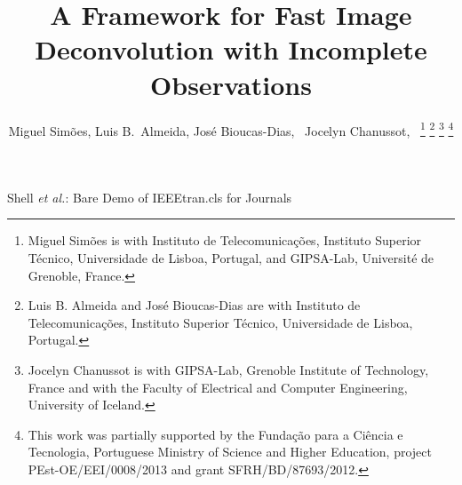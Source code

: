 \documentclass[10pt,twocolumn,twoside]{IEEEtran}
\begin{document}
\title{A Framework for Fast Image Deconvolution with Incomplete Observations}

\author{Miguel Sim\~{o}es, Luis B.\ Almeida, Jos\'{e} Bioucas-Dias,~ Jocelyn Chanussot,~%
\thanks{Miguel Sim\~{o}es is with Instituto de Telecomunica\c{c}\~{o}es, Instituto
Superior T\'{e}cnico, Universidade de Lisboa, Portugal, and GIPSA-Lab, Universit\'{e} de Grenoble, France.}%
\thanks{Luis B. Almeida and Jos\'{e} Bioucas-Dias are with Instituto de Telecomunica\c{c}\~{o}es, Instituto
Superior T\'{e}cnico, Universidade de Lisboa, Portugal.}%
\thanks{Jocelyn Chanussot is with GIPSA-Lab, Grenoble Institute of Technology, France and with the Faculty of Electrical and Computer Engineering, University of Iceland.}%
\thanks{This work was partially supported by the Funda\c{c}\~{a}o para a Ci\^{e}ncia e Tecnologia, Portuguese Ministry of Science and Higher Education, project PEst-OE/EEI/0008/2013 and grant SFRH/BD/87693/2012.}}




%
{Shell \MakeLowercase{\textit{et al.}}: Bare Demo of IEEEtran.cls for Journals}











\maketitle
\end{document}
